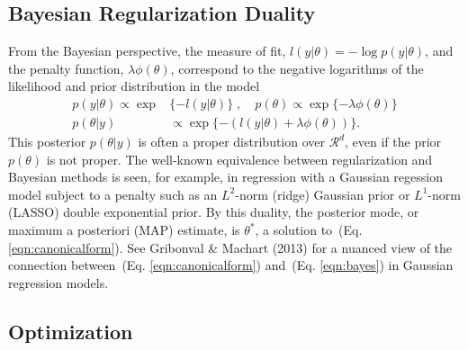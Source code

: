 \documentclass[12pt]{TD-CJS}
\newcommand{\R}{\mathcal{R}}
\DeclareMathOperator*{\argmin}{arg\,min}
\begin{document}
\subsection{Bayesian Regularization Duality}

From the Bayesian perspective, the measure of fit, $l(y|\theta) = - \log p(y| \theta)$, and the penalty function, $\lambda\phi(\theta)$, correspond to the negative logarithms of the likelihood and prior distribution in the model
\begin{equation}
\label{eqn:bayes}
\begin{aligned}
 p(y | \theta) \propto \exp & \{-  l(y|\theta)\} \; , \quad p(\theta) \propto \exp\{ - \lambda\phi(\theta) \} \\
p( \theta | y ) &  \propto \exp\{- ( l(y|\theta) + \lambda\phi(\theta) ) \}.
\end{aligned}
\end{equation}
This posterior $p(\theta|y)$  is often a proper distribution over $\R^d$, even if the prior $p(\theta)$ is not proper. 
The well-known equivalence between regularization and Bayesian methods is seen,
for example, in regression with a Gaussian regession model
subject to a penalty such as an $L^2$-norm (ridge) Gaussian prior or $ L^1$-norm (LASSO) 
double exponential prior.  By this duality, the posterior mode, or maximum a posteriori (MAP) estimate, is $\theta^*$,  
a solution to~(Eq. \ref{eqn:canonicalform}).
See Gribonval \& Machart (2013) for a nuanced view of the connection between~(Eq. \ref{eqn:canonicalform}) 
and~(Eq. \ref{eqn:bayes}) in
Gaussian regression models. 

\subsection{Optimization}
\end{document}
